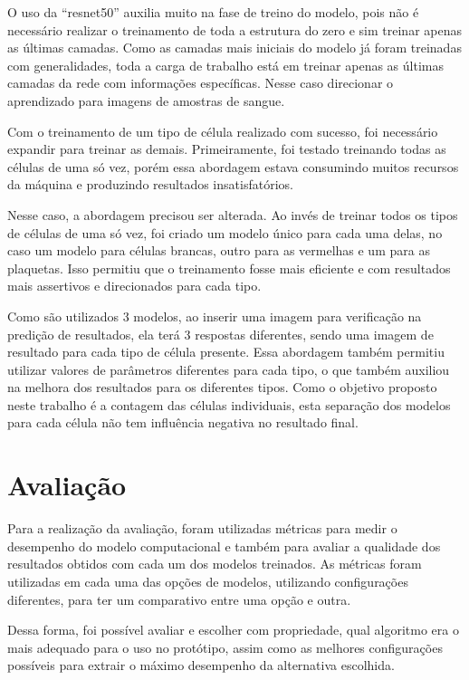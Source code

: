 O uso da ``resnet50'' auxilia muito na fase de treino do modelo, pois não é necessário realizar o treinamento de toda a estrutura do zero e sim treinar apenas as últimas camadas. Como as camadas mais iniciais do modelo já foram treinadas com generalidades, toda a carga de trabalho está em treinar apenas as últimas camadas da rede com informações específicas. Nesse caso direcionar o aprendizado para imagens de amostras de sangue.

Com o treinamento de um tipo de célula realizado com sucesso, foi necessário expandir para treinar as demais. Primeiramente, foi testado treinando todas as células de uma só vez, porém essa abordagem estava consumindo muitos recursos da máquina e produzindo resultados insatisfatórios.

Nesse caso, a abordagem precisou ser alterada. Ao invés de treinar todos os tipos de células de uma só vez, foi criado um modelo único para cada uma delas, no caso um modelo para células brancas, outro para as vermelhas e um para as plaquetas. Isso permitiu que o treinamento fosse mais eficiente e com resultados mais assertivos e direcionados para cada tipo.

Como são utilizados 3 modelos, ao inserir uma imagem para verificação na predição de resultados, ela terá 3 respostas diferentes, sendo uma imagem de resultado para cada tipo de célula presente. Essa abordagem também permitiu utilizar valores de parâmetros diferentes para cada tipo, o que também auxiliou na melhora dos resultados para os diferentes tipos. Como o objetivo proposto neste trabalho é a contagem das células individuais, esta separação dos modelos para cada célula não tem influência negativa no resultado final.

\section{Avaliação}
Para a realização da avaliação, foram utilizadas métricas para medir o desempenho do modelo computacional e também para avaliar a qualidade dos resultados obtidos com cada um dos modelos treinados. As métricas foram utilizadas em cada uma das opções de modelos, utilizando configurações diferentes, para ter um comparativo entre uma opção e outra.

Dessa forma, foi possível avaliar e escolher com propriedade, qual algoritmo era o mais adequado para o uso no protótipo, assim como as melhores configurações possíveis para extrair o máximo desempenho da alternativa escolhida.

